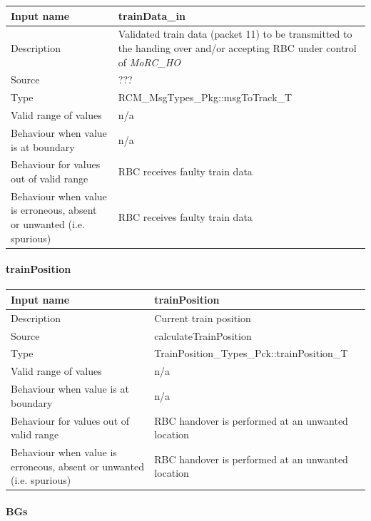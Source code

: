 \begin{longtable}{p{}p{}}
	\toprule
	Input name				& trainData\_in \\
	\midrule
	Description				& Validated train data (packet 11) to be transmitted to the handing over and/or accepting RBC under control of \emph{MoRC\_HO} \\
	\midrule
	Source					& ??? \\ 
	\midrule
	Type					& RCM\_MsgTypes\_Pkg::msgToTrack\_T \\
	\midrule
	Valid range of values	& n/a \\
	\midrule
	Behaviour when value is at boundary	& n/a \\
	\midrule
	Behaviour for values out of valid range	& RBC receives faulty train data \\
	\midrule
	Behaviour when value is erroneous, absent or unwanted (i.e. spurious) & RBC receives faulty train data \\
	\bottomrule
\end{longtable}

\paragraph{trainPosition}

\begin{longtable}{p{}p{}}
	\toprule
	Input name				& trainPosition \\
	\midrule
	Description				& Current train position \\
	\midrule
	Source					& calculateTrainPosition \\ 
	\midrule
	Type					& TrainPosition\_Types\_Pck::trainPosition\_T \\
	\midrule
	Valid range of values	& n/a \\
	\midrule
	Behaviour when value is at boundary	& n/a \\
	\midrule
	Behaviour for values out of valid range	& RBC handover is performed at an unwanted location \\
	\midrule
	Behaviour when value is erroneous, absent or unwanted (i.e. spurious) & RBC handover is performed at an unwanted location \\
	\bottomrule
\end{longtable}

\paragraph{BGs}

